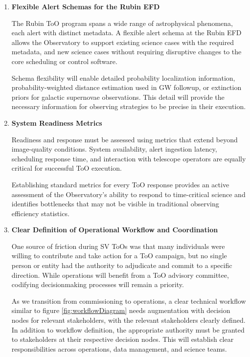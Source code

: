 \begin{enumerate}
\item \textbf{Flexible Alert Schemas for the Rubin EFD}

The Rubin ToO program spans a wide range of astrophysical phenomena, each alert with distinct metadata. A flexible alert schema at the Rubin EFD allows the Observatory to support existing science cases with the required metadata, and new science cases without requiring disruptive changes to the core scheduling or control software.

Schema flexibility will enable detailed probability localization information, probability-weighted distance estimation used in GW followup, or extinction priors for galactic supernovae observations. This detail will provide the necessary information for observing strategies to be precise in their execution.

\item \textbf{System Readiness Metrics}

Readiness and response must be assessed using metrics that extend beyond image-quality conditions. System availability, alert ingestion latency, scheduling response time, and interaction with telescope operators are equally critical for successful ToO execution.

Establishing standard metrics for every ToO response provides an active assessment of the Observatory’s ability to respond to time-critical science and identifies bottlenecks that may not be visible in traditional observing efficiency statistics.

\item \textbf{Clear Definition of Operational Workflow and Coordination}

One source of friction during SV ToOs was that many individuals were willing to contribute and take action for a ToO campaign, but no single person or entity had the authority to adjudicate and commit to a specific direction. While operations will benefit from a ToO advisory committee, codifying decisionmaking processes will remain a priority.

As we transition from commissioning to operations, a clear technical workflow similar to figure \ref{fig:workflowDiagram} needs augmentation with decision nodes for relevant stakeholders, with the relevant stakeholders clearly defined. In addition to workflow definition, the appropriate authority must be granted to stakeholders at their respective decision nodes. This will establish clear responsibilities across operations, data management, and science teams.


\end{enumerate}
